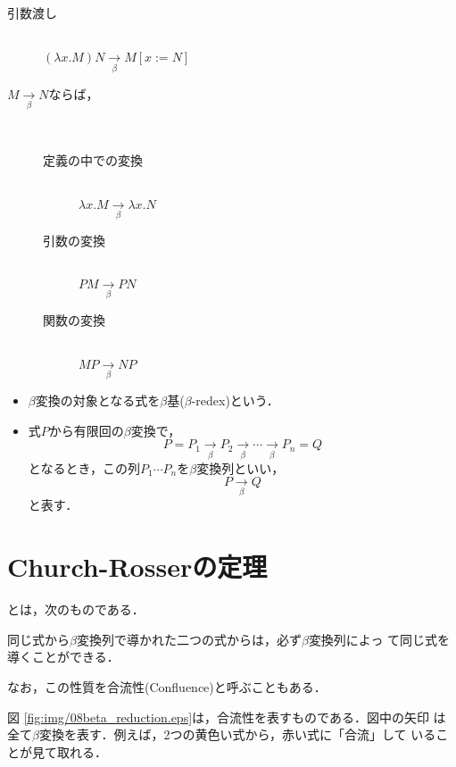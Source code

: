 \begin{description}
 \item[引数渡し]  \mbox{} \\
            $(\lambda x . M) N \underset{\beta}{\longrightarrow} M[x:=N]$ 

 \item[$M \underset{\beta}{\longrightarrow} N$ならば，] \mbox{} \\
            \begin{description}
             \item[定義の中での変換] \mbox{} \\
                        $\lambda x . M \underset{\beta}{\longrightarrow} \lambda x . N$ 

             \item[引数の変換]  \mbox{} \\
                        $ PM \underset{\beta}{\longrightarrow} PN$ 
             \item[関数の変換]  \mbox{} \\
                        $MP \underset{\beta}{\longrightarrow} NP$
            \end{description}
\end{description}


\begin{itemize}
 \item $\beta$変換の対象となる式を$\beta$基($\beta$-redex)という．
 \item 式$P$から有限回の$\beta$変換で，
       \[
        P = P_1 \underset{\beta}{\longrightarrow} P_2 \underset{\beta}{\longrightarrow} \cdots
       \underset{\beta}{\longrightarrow} P_n = Q
       \]
       となるとき，この列$P_1 \cdots P_n$を$\beta$変換列といい，
       \[
        P \underset{\beta}{\longrightarrow} Q
       \]
       と表す．
\end{itemize}

\section{Church-Rosserの定理}
とは，次のものである．

\begin{mytheorem}
同じ式から$\beta$変換列で導かれた二つの式からは，必ず$\beta$変換列によっ
て同じ式を導くことができる．
\end{mytheorem}
なお，この性質を合流性(Confluence)と呼ぶこともある．

図
\ref{fig:img/08beta_reduction.eps}は，合流性を表すものである．図中の矢印
は全て$\beta$変換を表す．例えば，2つの黄色い式から，赤い式に「合流」して
いることが見て取れる．


